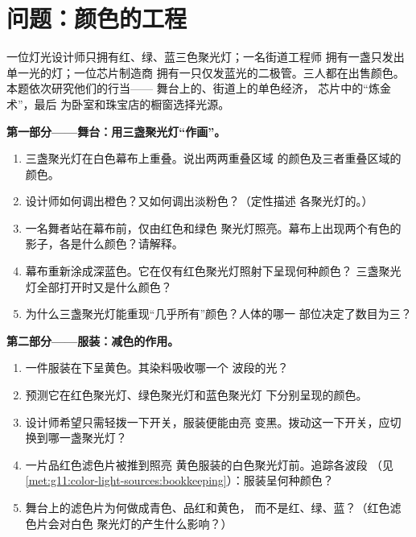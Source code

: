 \section{问题：颜色的工程}

\begin{problem}
\label{pb:g11:color-light-sources:1}
一位灯光设计师只拥有红、绿、蓝三色聚光灯；一名街道工程师
拥有一盏只发出单一光的灯；一位芯片制造商
拥有一只仅发蓝光的二极管。三人都在出售颜色。本题依次研究他们的行当——
舞台上的、街道上的单色经济，
芯片中的“炼金术”，最后
为卧室和珠宝店的橱窗选择光源。

\medskip
\noindent\textbf{第一部分——舞台：用三盏聚光灯“作画”。}
\begin{enumerate}
  \item 三盏聚光灯在白色幕布上重叠。说出两两重叠区域
        的颜色及三者重叠区域的颜色。
  \item 设计师如何调出橙色？又如何调出淡粉色？（定性描述
        各聚光灯的。）
  \item 一名舞者站在幕布前，仅由红色和绿色
        聚光灯照亮。幕布上出现两个有色的影子，各是什么颜色？请解释。
  \item 幕布重新涂成深蓝色。它在仅有红色聚光灯照射下呈现何种颜色？
        三盏聚光灯全部打开时又是什么颜色？
  \item 为什么三盏聚光灯能重现“几乎所有”颜色？人体的哪一
        部位决定了数目为三？
\end{enumerate}

\medskip
\noindent\textbf{第二部分——服装：减色的作用。}
\begin{enumerate}[resume]
  \item 一件服装在下呈黄色。其染料吸收哪一个
        波段的光？
  \item 预测它在红色聚光灯、绿色聚光灯和蓝色聚光灯
        下分别呈现的颜色。
  \item 设计师希望只需轻拨一下开关，服装便能由亮
        变黑。拨动这一下开关，应切换到哪一盏聚光灯？
  \item 一片品红色滤色片被推到照亮
        黄色服装的白色聚光灯前。追踪各波段
        （见\cref{met:g11:color-light-sources:bookkeeping}）：服装呈何种颜色？
  \item 舞台上的滤色片为何做成青色、品红和黄色，
        而不是红、绿、蓝？（红色滤色片会对白色
        聚光灯的产生什么影响？）
\end{enumerate}


\end{problem}
